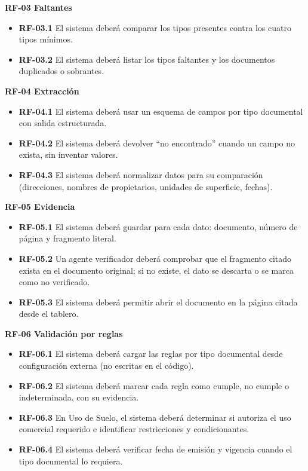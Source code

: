 \documentclass[11pt, a4paper]{article}
\begin{document}
\textbf{RF-03 Faltantes}
\begin{itemize}
    \item \textbf{RF-03.1} El sistema deberá comparar los tipos presentes contra los cuatro tipos mínimos.
    \item \textbf{RF-03.2} El sistema deberá listar los tipos faltantes y los documentos duplicados o sobrantes.
\end{itemize}

\textbf{RF-04 Extracción}
\begin{itemize}
    \item \textbf{RF-04.1} El sistema deberá usar un esquema de campos por tipo documental con salida estructurada.
    \item \textbf{RF-04.2} El sistema deberá devolver ``no encontrado'' cuando un campo no exista, sin inventar valores.
    \item \textbf{RF-04.3} El sistema deberá normalizar datos para su comparación (direcciones, nombres de propietarios, unidades de superficie, fechas).
\end{itemize}

\textbf{RF-05 Evidencia}
\begin{itemize}
    \item \textbf{RF-05.1} El sistema deberá guardar para cada dato: documento, número de página y fragmento literal.
    \item \textbf{RF-05.2} Un agente verificador deberá comprobar que el fragmento citado exista en el documento original; si no existe, el dato se descarta o se marca como no verificado.
    \item \textbf{RF-05.3} El sistema deberá permitir abrir el documento en la página citada desde el tablero.
\end{itemize}

\textbf{RF-06 Validación por reglas}
\begin{itemize}
    \item \textbf{RF-06.1} El sistema deberá cargar las reglas por tipo documental desde configuración externa (no escritas en el código).
    \item \textbf{RF-06.2} El sistema deberá marcar cada regla como cumple, no cumple o indeterminada, con su evidencia.
    \item \textbf{RF-06.3} En Uso de Suelo, el sistema deberá determinar si autoriza el uso comercial requerido e identificar restricciones y condicionantes.
    \item \textbf{RF-06.4} El sistema deberá verificar fecha de emisión y vigencia cuando el tipo documental lo requiera.
\end{itemize}
\end{document}
